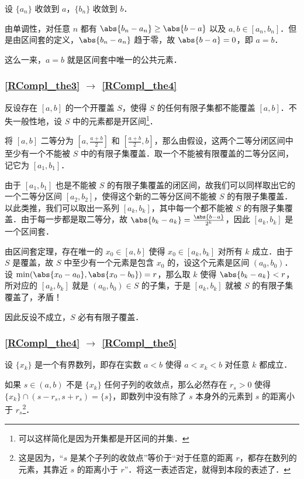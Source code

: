 设 $\{a_n\}$ 收敛到 $a$，$\{b_n\}$ 收敛到 $b$．

由单调性，对任意 $n$ 都有 $\abs{b_n-a_n}\geq\abs{b-a}$ 以及 $a, b\in [a_n, b_n]$．但是由区间套的定义，$\abs{b_n-a_n}$ 趋于零，故 $\abs{b-a}=0$，即 $a=b$．

这么一来，$a=b$ 就是区间套中唯一的公共元素．

\subsubsection{\autoref{RCompl_the3} $\to$ \autoref{RCompl_the4} }

反设存在 $[a, b]$ 的一个开覆盖 $S$，使得 $S$ 的任何有限子集都不能覆盖 $[a, b]$．不失一般性地，设 $S$ 中的元素都是开区间\footnote{可以这样简化是因为开集都是开区间的并集．}．

将 $[a, b]$ 二等分为 $[a, \frac{a+b}{2}]$ 和 $[\frac{a+b}{2}, b]$，那么由假设，这两个二等分闭区间中至少有一个不能被 $S$ 中的有限子集覆盖．取一个不能被有限覆盖的二等分区间，记它为 $[a_1, b_1]$．

由于 $[a_1, b_1]$ 也是不能被 $S$ 的有限子集覆盖的闭区间，故我们可以同样取出它的一个二等分区间 $[a_2, b_2]$，使得这个新的二等分区间不能被 $S$ 的有限子集覆盖．以此类推，我们可以取出一系列 $[a_k, b_k]$，其中每一个都不能被 $S$ 的有限子集覆盖．由于每一步都是取二等分，故 $\abs{b_k-a_k}=\frac{\abs{b-a}}{2^k}$，因此 $[a_k, b_k]$ 是一个区间套．

由区间套定理，存在唯一的 $x_0\in[a, b]$ 使得 $x_0\in[a_k, b_k]$ 对所有 $k$ 成立．由于 $S$ 是覆盖，故 $S$ 中至少有一个元素是包含 $x_0$ 的，设这个元素是区间 $(a_0, b_0)$．设 $\min(\abs{x_0-a_0}, \abs{x_0-b_0})=r$，那么取 $k$ 使得 $\abs{b_k-a_k}<r$，所对应的 $[a_k, b_k]$ 就是 $(a_0, b_0)\in S$ 的子集，于是 $[a_k, b_k]$ 就被 $S$ 的有限子集覆盖了，矛盾！

因此反设不成立，$S$ 必有有限子覆盖．

\subsubsection{\autoref{RCompl_the4} $\to$ \autoref{RCompl_the5} }

设 $\{x_k\}$ 是一个有界数列，即存在实数 $a<b$ 使得 $a<x_k<b$ 对任意 $k$ 都成立．

如果 $s\in(a, b)$ 不是 $\{x_k\}$ 任何子列的收敛点，那么必然存在 $r_s>0$ 使得 $\{x_k\}\cap (s-r_s, s+r_s)=\{s\}$，即数列中没有除了 $s$ 本身外的元素到 $s$ 的距离小于 $r_s$\footnote{这是因为，“$s$ 是某个子列的收敛点”等价于“对于任意的距离 $r$，都存在数列的元素，其靠近 $s$ 的距离小于 $r$”．将这一表述否定，就得到本段的表述了．}．

